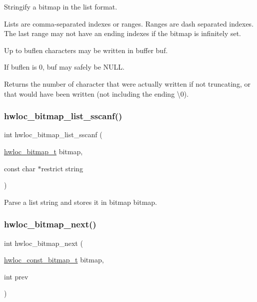 Stringify a bitmap in the list format. 

Lists are comma-\/separated indexes or ranges. Ranges are dash separated indexes. The last range may not have an ending indexes if the bitmap is infinitely set.

Up to {\ttfamily buflen} characters may be written in buffer {\ttfamily buf}.

If {\ttfamily buflen} is 0, {\ttfamily buf} may safely be {\ttfamily N\+U\+LL}.

\begin{DoxyReturn}{Returns}
the number of character that were actually written if not truncating, or that would have been written (not including the ending \textbackslash{}0). 
\end{DoxyReturn}
\mbox{\label{a00205_gaf9314311d482c621e17c6a53a9fe993e}} 
\subsubsection{\texorpdfstring{hwloc\+\_\+bitmap\+\_\+list\+\_\+sscanf()}{hwloc\_bitmap\_list\_sscanf()}}
{\footnotesize\ttfamily int hwloc\+\_\+bitmap\+\_\+list\+\_\+sscanf (\begin{DoxyParamCaption}\item[{\hyperlink{a00205_gaa3c2bf4c776d603dcebbb61b0c923d84}{hwloc\+\_\+bitmap\+\_\+t}}]{bitmap,  }\item[{const char $\ast$restrict}]{string }\end{DoxyParamCaption})}



Parse a list string and stores it in bitmap {\ttfamily bitmap}. 

\mbox{\label{a00205_gaab7240b4b644693b775dad17b44ffd68}} 
\subsubsection{\texorpdfstring{hwloc\+\_\+bitmap\+\_\+next()}{hwloc\_bitmap\_next()}}
{\footnotesize\ttfamily int hwloc\+\_\+bitmap\+\_\+next (\begin{DoxyParamCaption}\item[{\hyperlink{a00205_gae991a108af01d408be2776c5b2c467b2}{hwloc\+\_\+const\+\_\+bitmap\+\_\+t}}]{bitmap,  }\item[{int}]{prev }\end{DoxyParamCaption})}



